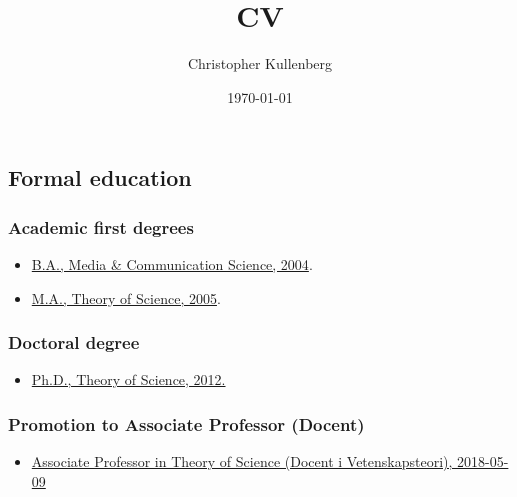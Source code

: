 \documentclass[
]{article}
\title{CV}
\author{Christopher Kullenberg}
\date{\today}
\providecommand{\tightlist}{%
  \setlength{\itemsep}{0pt}\setlength{\parskip}{0pt}}
\begin{document}
\maketitle

\newpage

\hypertarget{formal-education}{%
\subsection{Formal education}\label{formal-education}}

\hypertarget{academic-first-degrees}{%
\subsubsection{Academic first degrees}\label{academic-first-degrees}}

\begin{itemize}
\tightlist
\item
  \href{http://files.christopherkullenberg.se/examengrundutbildningonline.pdf}{B.A.,
  Media \& Communication Science, 2004}.
\item
  \href{http://files.christopherkullenberg.se/examengrundutbildningonline.pdf}{M.A.,
  Theory of Science, 2005}.
\end{itemize}

\hypertarget{doctoral-degree}{%
\subsubsection{Doctoral degree}\label{doctoral-degree}}

\begin{itemize}
\tightlist
\item
  \href{http://files.christopherkullenberg.se/doctoraldegreeonline.pdf}{Ph.D.,
  Theory of Science, 2012.}
\end{itemize}

\hypertarget{promotion-to-associate-professor-docent}{%
\subsubsection{Promotion to Associate Professor
(Docent)}\label{promotion-to-associate-professor-docent}}

\begin{itemize}
\tightlist
\item
  \href{http://files.christopherkullenberg.se/Docentbevis_ChristopherKullenberg_P2017_366_anon.pdf}{Associate
  Professor in Theory of Science (Docent i Vetenskapsteori), 2018-05-09}
\end{itemize}
\end{document}
